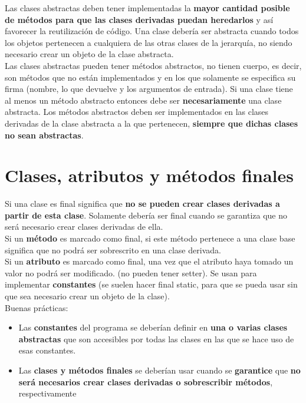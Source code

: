 \documentclass{article}
\begin{document}
Las clases abstractas deben tener implementadas la \textbf{mayor cantidad posible de métodos para que las clases derivadas puedan heredarlos} y así favorecer la reutilización de código. Una clase debería ser abstracta cuando todos los objetos pertenecen a cualquiera de las otras clases de la jerarquía, no
siendo necesario crear un objeto de la clase abstracta. \\

Las clases abstractas pueden tener métodos abstractos, no tienen cuerpo, es decir, son métodos que no están implementados y en los que solamente se especifica su firma (nombre, lo que devuelve y los argumentos de entrada). Si una clase tiene al menos un método abstracto entonces debe ser
\textbf{necesariamente} una clase abstracta. Los métodos abstractos deben ser implementados en las clases derivadas de la clase abstracta a la que pertenecen, \textbf{siempre que dichas clases no sean abstractas}.

\section{Clases, atributos y métodos finales}
Si una clase es final significa que \textbf{no se pueden crear clases derivadas a partir de esta clase}. Solamente debería ser final cuando se garantiza que no será necesario crear clases derivadas de ella. \\

Si un \textbf{método} es marcado como final, si este método pertenece a una clase base significa que no podrá ser sobrescrito en una clase derivada. \\

Si un \textbf{atributo} es marcado como final, una vez que el atributo haya tomado un valor no podrá ser modificado. (no pueden tener setter). Se usan para implementar \textbf{constantes} (se suelen hacer final static, para que se pueda usar sin que sea necesario crear un objeto de la clase). \\

Buenas prácticas:
\begin{itemize}
    \item Las \textbf{constantes} del programa se deberían definir en \textbf{una o varias clases abstractas} que son accesibles por todas las clases en las que se hace uso de esas constantes.
    \item Las \textbf{clases y métodos finales} se deberían usar cuando se \textbf{garantice} que \textbf{no será necesarios crear clases derivadas o sobrescribir métodos}, respectivamente
\end{itemize}
\end{document}

